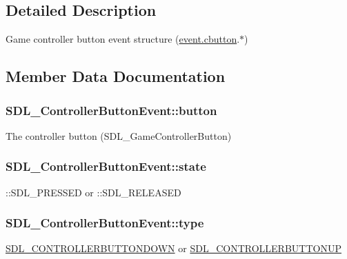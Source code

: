 \subsection{Detailed Description}
Game controller button event structure (\hyperlink{union_s_d_l___event_aee2b5671c8dcdb447023715cc21593cb}{event.\+cbutton}.$\ast$) 

\subsection{Member Data Documentation}
\hypertarget{struct_s_d_l___controller_button_event_a039da6cd31c3c62e62a3ae17cc64d0db}{}
\subsubsection[{button}]{ S\+D\+L\+\_\+\+Controller\+Button\+Event\+::button}\label{struct_s_d_l___controller_button_event_a039da6cd31c3c62e62a3ae17cc64d0db}
The controller button (S\+D\+L\+\_\+\+Game\+Controller\+Button) \hypertarget{struct_s_d_l___controller_button_event_a00c46683f86674c2a4f74404ee3e857c}{}
\subsubsection[{state}]{ S\+D\+L\+\_\+\+Controller\+Button\+Event\+::state}\label{struct_s_d_l___controller_button_event_a00c46683f86674c2a4f74404ee3e857c}
\+::\+S\+D\+L\+\_\+\+P\+R\+E\+S\+S\+E\+D or \+::\+S\+D\+L\+\_\+\+R\+E\+L\+E\+A\+S\+E\+D \hypertarget{struct_s_d_l___controller_button_event_a09869d792031e47a88673d85915c209f}{}
\subsubsection[{type}]{ S\+D\+L\+\_\+\+Controller\+Button\+Event\+::type}\label{struct_s_d_l___controller_button_event_a09869d792031e47a88673d85915c209f}
\hyperlink{_s_d_l__events_8h_a3b589e89be6b35c02e0dd34a55f3fccaaafe044d5f92ac9608ded473218569474}{S\+D\+L\+\_\+\+C\+O\+N\+T\+R\+O\+L\+L\+E\+R\+B\+U\+T\+T\+O\+N\+D\+O\+W\+N} or \hyperlink{_s_d_l__events_8h_a3b589e89be6b35c02e0dd34a55f3fccaa8cb5a10b1ae0e185ef69a321d3d2d1be}{S\+D\+L\+\_\+\+C\+O\+N\+T\+R\+O\+L\+L\+E\+R\+B\+U\+T\+T\+O\+N\+U\+P} \hypertarget{struct_s_d_l___controller_button_event_a98777e88b5d5cae83eef16ffd4bcacc1}{}
